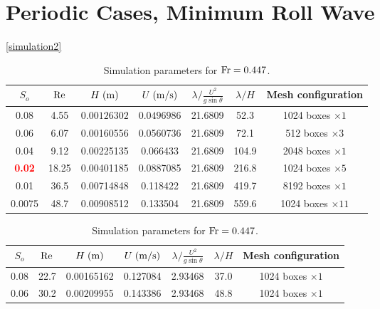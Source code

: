 \documentclass[a4paper]{article}
\newcommand{\fr}{{\rm{Fr}}}
\newcommand{\sa}{\sin\theta}
\begin{document}
\section{Periodic Cases, Minimum Roll Wave}
\autoref{simulation2}
\begin{table}[htbp]
	\begin{subtable}{1\textwidth}
		\centering
		\begin{tabular}{ccccccc}
			$S_o$ & $\rm Re$ & $H\;{\rm (m)}$ & $U\;{\rm (m/s)}$ & $\lambda/\frac{U^2}{g\sa}$ & $\lambda/H$ & Mesh configuration\\
			\toprule
			0.08 & 4.55 & $0.00126302$ & $0.0496986$ & 21.6809 & 52.3 & 1024 boxes $\times 1$\\
			
			0.06 & 6.07 & 0.00160556 & 0.0560736 & 21.6809 & 72.1 & 512 boxes $\times 3$\\
			
			0.04 & 9.12 & 0.00225135 & 0.066433 & 21.6809 & 104.9 & 2048 boxes $\times 1$\\
			
			\textcolor{red}{\bf 0.02} & 18.25 & 0.00401185 & 0.0887085 & 21.6809 & 216.8 & 1024 boxes $\times 5$\\
			
			0.01 & 36.5 & 0.00714848 & 0.118422 & 21.6809 & 419.7 & 8192 boxes $\times 1$\\
			
			0.0075 & 48.7 & 0.00908512 & 0.133504 & 21.6809 & 559.6 & 1024 boxes $\times 11$\\
			
			\bottomrule 
		\end{tabular}
		\caption{Simulation parameters for $\fr=0.447$.}
		\label{params_0447}
	\end{subtable}
	
	\vspace{0.25cm}
	
	\begin{subtable}{1\textwidth}
		\centering
		\begin{tabular}{ccccccc}
			$S_o$ & $\rm Re$ & $H\;{\rm (m)}$ & $U\;{\rm (m/s)}$ & $\lambda/\frac{U^2}{g\sa}$ & $\lambda/H$ & Mesh configuration\\
			\toprule
			0.08 & 22.7 & 0.00165162 & 0.127084 & 2.93468 & 37.0 & 1024 boxes $\times 1$\\
			
			0.06 & 30.2 & 0.00209955 & 0.143386 & 2.93468 & 48.8 & 1024 boxes $\times 1$\\
			

\end{tabular}
\end{subtable}
\end{table}
\end{document}
